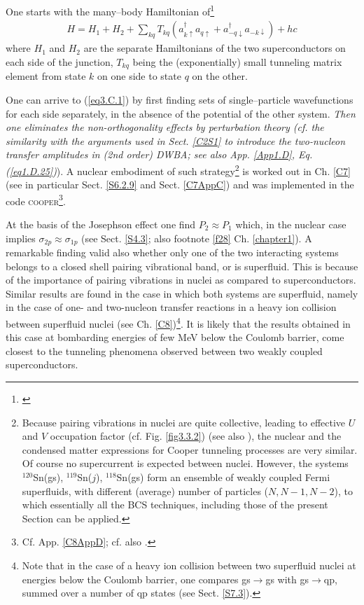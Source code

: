 One starts with the many--body Hamiltonian of\footnote{\cite{Cohen:62}}
\begin{align}\label{eq3.C.1}
H=H_1+H_2+\sum_{kq}T_{kq}(a_{k\uparrow}^\dagger a_{q\uparrow}+a_{-q\downarrow}^\dagger a_{-k\downarrow})+hc
\end{align}
where $H_1$ and $H_2$ are the separate Hamiltonians of the two superconductors on each side of the junction, $T_{kq}$ being the (exponentially) small tunneling matrix element from state $k$ on one side to state $q$ on the other.


One can arrive to  (\ref{eq3.C.1}) by first finding sets of single--particle wavefunctions for each side separately, in the absence of the potential of the other system. \textit{Then one eliminates the non-orthogonality effects by perturbation theory (cf. the similarity with the arguments used in Sect. \ref{C2S1} to introduce the two-nucleon transfer amplitudes in (2nd order) DWBA; see also App. \ref{App1.D}, Eq. (\ref{eq1.D.25})}). A nuclear embodiment of such strategy\footnote{\label{f45}Because  pairing vibrations in nuclei are quite collective, leading to effective $U$ and $V$ occupation factor (cf. Fig. \ref{fig3.3.2}) (see also \cite{Potel:13b}), the nuclear and the condensed matter expressions for Cooper tunneling processes are very similar. Of course no supercurrent is expected between nuclei. However, the systems $^{120}$Sn(gs), $^{119}$Sn($j$), $^{118}$Sn(gs) form an ensemble of weakly coupled Fermi superfluids, with different (average) number of particles ($N,N-1,N-2$), to which essentially all the BCS techniques, including those of the present Section can be applied.} is worked out in Ch. \ref{C7} (see in particular Sect. \ref{S6.2.9} and Sect. \ref{C7AppC}) and was implemented in the code \textsc{cooper}\footnote{Cf. App. \ref{C8AppD}; cf. also \cite{Broglia:04a}.}. 


At the basis of the Josephson effect one find $P_2\approx P_1$ which, in the nuclear case implies $\sigma_{2p}\approx\sigma_{1p}$ (see Sect. \ref{S4.3}; also footnote \ref{f28} Ch. \ref{chapter1}). A remarkable finding  valid also whether only one of the two interacting systems belongs to a closed shell pairing vibrational band, or is superfluid. This is because of the importance of pairing vibrations in nuclei as compared to superconductors. Similar results are found in the case in which both systems are superfluid, namely in the case of  one- and two-nucleon transfer reactions in a heavy ion collision between superfluid nuclei (see Ch. \ref{C8})\footnote{Note that in the case of a heavy ion collision between two superfluid nuclei at energies below the Coulomb barrier, one compares gs$\to$gs with gs$\to$qp, summed over a number of qp states (see Sect. \ref{S7.3}).}. 
It is likely that the results obtained in this case at bombarding energies of few MeV below the Coulomb barrier, come closest to the tunneling phenomena observed between two weakly coupled superconductors.

